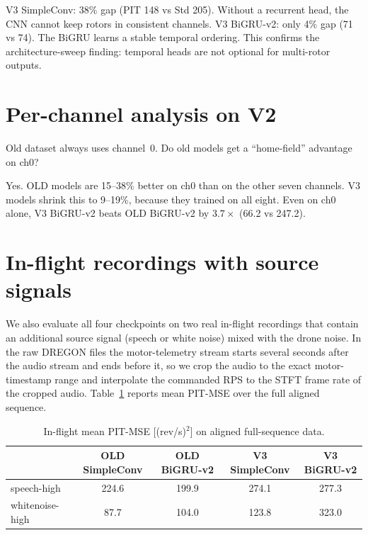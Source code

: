 \documentclass[11pt,a4paper]{article}
\begin{document}
V3 SimpleConv: 38\% gap (PIT 148 vs Std 205). Without a recurrent head,
the CNN cannot keep rotors in consistent channels. V3 BiGRU-v2: only 4\%
gap (71 vs 74). The BiGRU learns a stable temporal ordering. This confirms
the architecture-sweep finding: temporal heads are not optional for
multi-rotor outputs.

\section{Per-channel analysis on V2}

Old dataset always uses channel~0. Do old models get a ``home-field''
advantage on ch0?

\begin{table}[ht]
  \centering
  \caption{PIT-MSE on V2 valid, split by microphone channel.}
  \label{tab:channel}
  \small
  
\end{table}

Yes. OLD models are 15--38\% better on ch0 than on the other seven
channels. V3 models shrink this to 9--19\%, because they trained on all
eight. Even on ch0 alone, V3 BiGRU-v2 beats OLD BiGRU-v2 by $3.7\times$
(66.2 vs 247.2).

\section{In-flight recordings with source signals}

We also evaluate all four checkpoints on two real in-flight recordings that
contain an additional source signal (speech or white noise) mixed with the
drone noise.  In the raw DREGON files the motor-telemetry stream starts
several seconds after the audio stream and ends before it, so we crop the
audio to the exact motor-timestamp range and interpolate the commanded RPS
to the STFT frame rate of the cropped audio.  Table~\ref{tab:inflight}
reports mean PIT-MSE over the full aligned sequence.

\begin{table}[ht]
  \centering
  \caption{In-flight mean PIT-MSE [(rev/s)$^2$] on aligned full-sequence data.}
  \label{tab:inflight}
  \small
  \begin{tabular}{lcccc}
    \toprule
    & OLD SimpleConv & OLD BiGRU-v2 & V3 SimpleConv & V3 BiGRU-v2 \\
    \midrule
    speech-high  & 224.6 & 199.9 & 274.1 & 277.3 \\
    whitenoise-high & 87.7 & 104.0 & 123.8 & 323.0 \\
    \bottomrule
  \end{tabular}
\end{table}
\end{document}
